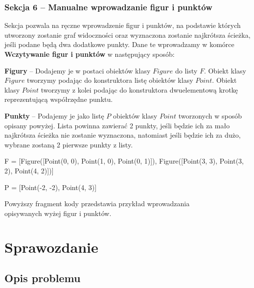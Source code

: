 \documentclass[12pt]{article}
\let\tempone\itemize
\let\temptwo\enditemize
\renewenvironment{itemize}{\tempone\setlength{\itemsep}{0cm}}{\temptwo}
\begin{document}
			\subsubsection{Sekcja 6 -- Manualne wprowadzanie figur i punktów}
				Sekcja pozwala na ręczne wprowadzenie figur i punktów, na podstawie których utworzony zostanie graf widoczności oraz wyznaczona zostanie najkrótsza ścieżka, jeśli podane będą dwa dodatkowe punkty. Dane te wprowadzamy w komórce \textbf{Wczytywanie figur i punktów} w następujący sposób:
				\begin{itemize}
					\item \textbf{Figury} -- Dodajemy je w postaci obiektów klasy $ Figure $ do listy $ F $. Obiekt klasy $ Figure $ tworzymy podając do konstruktora listę obiektów klasy $ Point $. Obiekt klasy $ Point $ tworzymy z kolei podając do konstruktora dwuelementową krotkę reprezentującą współrzędne punktu.
					\item \textbf{Punkty} -- Podajemy je jako listę $ P $ obiektów klasy $ Point $ tworzonych w sposób opisany powyżej. Lista powinna zawierać 2 punkty, jeśli będzie ich za mało najkrótsza ścieżka nie zostanie wyznaczona, natomiast jeśli będzie ich za dużo, wybrane zostaną 2 pierwsze punkty z listy.
				\end{itemize}
				
				\vspace{\baselineskip} %
				
				\begin{python}
					
F = [Figure([Point(0, 0), Point(1, 0), Point(0, 1)]), 
	 Figure([Point(3, 3), Point(3, 2), Point(4, 2)])]

P = [Point(-2, -2), Point(4, 3)] 
				\end{python}
				
				\begin{center}
					Powyższy fragment kody przedstawia przykład wprowadzania\\ opisywanych wyżej figur i punktów.
				\end{center}
			
		
	\section{Sprawozdanie}
	
	\subsection{Opis problemu} \label{sssec:opis}
\end{document}
